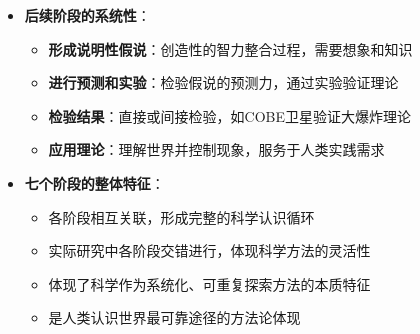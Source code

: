 \begin{center}
{{\begin{itemize}
\begin{itemize}
  \end{itemize}
\item \textbf{后续阶段的系统性}：
  \begin{itemize}
  \item \textbf{形成说明性假说}：创造性的智力整合过程，需要想象和知识
  \item \textbf{进行预测和实验}：检验假说的预测力，通过实验验证理论
  \item \textbf{检验结果}：直接或间接检验，如COBE卫星验证大爆炸理论
  \item \textbf{应用理论}：理解世界并控制现象，服务于人类实践需求
  \end{itemize}
\item \textbf{七个阶段的整体特征}：
  \begin{itemize}
  \item 各阶段相互关联，形成完整的科学认识循环
  \item 实际研究中各阶段交错进行，体现科学方法的灵活性
  \item 体现了科学作为系统化、可重复探索方法的本质特征
  \item 是人类认识世界最可靠途径的方法论体现
  \end{itemize}
\end{itemize}
}}
\end{center}